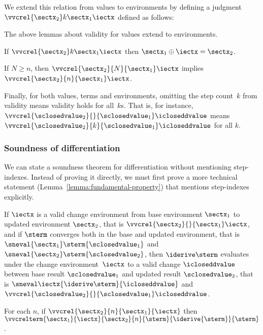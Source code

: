 \noindent
We extend this relation from values to environments by defining a
judgment $\vvcrel {\sectx_2} k {\sectx_1} \iectx$ defined as follows:
\begin{mathpar}

\end{mathpar}

The above lemmas about validity for values extend to environments.
\begin{lemma}
  \label{lemma:crel-oplus-env}
  If
  $\vvcrel {\sectx_2} k {\sectx_1} \iectx$ then
  $\sectx_1 \oplus \iectx = \sectx_2$.
\end{lemma}
\begin{lemma}
  \label{lemma:vvcrel-antimono-env}
  If $N \ge n$, then $\vvcrel{\sectx_2} {N} {\sectx_1} \iectx$ implies
  $\vvcrel{\sectx_2} {n} {\sectx_1} \iectx$.
\end{lemma}

Finally, for both values, terms and environments, omitting the step
count~$k$ from validity means validity holds for all~$k$s. That is,
for instance,
$\vvcrel {\sclosedvalue_2} {} {\sclosedvalue_1} \icloseddvalue$ means
$\vvcrel {\sclosedvalue_2} {k} {\sclosedvalue_1} \icloseddvalue$ for
all $k$.

\subsubsection{Soundness of differentiation}


We can state a soundness theorem for differentiation without
mentioning step-indexes. Instead of proving it directly, we must first
prove a more technical statement
(Lemma~\ref{lemma:fundamental-property}) that mentions step-indexes
explicitly.
%
\begin{theorem}
  \label{thm:sound-derive}
  If $\iectx$ is a valid change environment from base environment $\sectx_1$ to
  updated environment $\sectx_2$, that is $\vvcrel {\sectx_2} {} {\sectx_1}\iectx$,
  and if $\sterm$ converges both in the base and updated environment, that is
  $\sneval{\sectx_1}\sterm{\sclosedvalue_1}$ and
  $\sneval{\sectx_2}\sterm{\sclosedvalue_2}$,
  then $\iderive\sterm$ evaluates under the change environment~$\iectx$ to a valid
  change $\icloseddvalue$ between base result ${\sclosedvalue_1}$ and updated result
  ${\sclosedvalue_2}$, that is
  $\sneval\iectx{\iderive\sterm}{\icloseddvalue}$ and
  $\vvcrel{\sclosedvalue_2} {} {\sclosedvalue_1}
  \icloseddvalue$.
\end{theorem}

\begin{lemma}
  \label{lemma:fundamental-property}
For each $n$,
if $\vvcrel{\sectx_2}{n}{\sectx_1}{\iectx}$ then
$\vvcrelterm{\sectx_1}{\iectx}{\sectx_2}{n}{\sterm}{\iderive{\sterm}}{\sterm}$.
\end{lemma}
